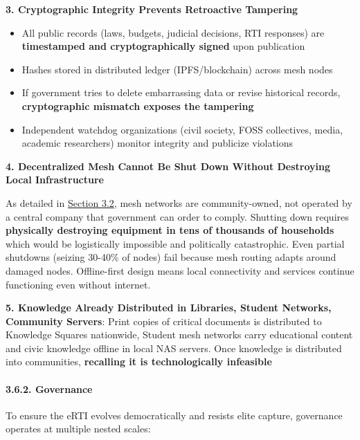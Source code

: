 \textbf{3. Cryptographic Integrity Prevents Retroactive Tampering}

\begin{itemize}
\tightlist
\item
  All public records (laws, budgets, judicial decisions, RTI responses)
  are \textbf{timestamped and cryptographically signed} upon publication
\item
  Hashes stored in distributed ledger (IPFS/blockchain) across mesh
  nodes
\item
  If government tries to delete embarrassing data or revise historical
  records, \textbf{cryptographic mismatch exposes the tampering}
\item
  Independent watchdog organizations (civil society, FOSS collectives,
  media, academic researchers) monitor integrity and publicize
  violations
\end{itemize}

\textbf{4. Decentralized Mesh Cannot Be Shut Down Without Destroying
Local Infrastructure}

As detailed in \hyperref[32-the-peoples-internet]{Section 3.2}, mesh
networks are community-owned, not operated by a central company that
government can order to comply. Shutting down requires
\textbf{physically destroying equipment in tens of thousands of
households} which would be logistically impossible and politically
catastrophic. Even partial shutdowns (seizing 30-40\% of nodes) fail
because mesh routing adapts around damaged nodes. Offline-first design
means local connectivity and services continue functioning even without
internet.

\textbf{5. Knowledge Already Distributed in Libraries, Student Networks,
Community Servers}: Print copies of critical documents is distributed to
Knowledge Squares nationwide, Student mesh networks carry educational
content and civic knowledge offline in local NAS servers. Once knowledge
is distributed into communities, \textbf{recalling it is technologically
infeasible}

\paragraph{3.6.2. Governance}\label{governance}

To ensure the eRTI evolves democratically and resists elite capture,
governance operates at multiple nested scales:

